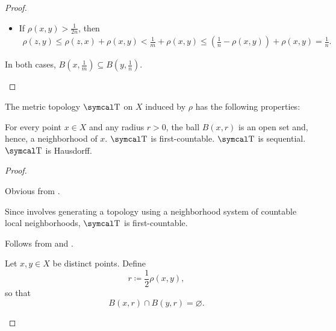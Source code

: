 \begin{proof}
\begin{description}
\begin{itemize}
      \item If \( \rho(x, y) > \tfrac 1 {2n} \), then
      \begin{align*}
        \rho(z, y)
        \leq
        \rho(z, x) + \rho(x, y)
        <
        \tfrac 1 m + \rho(x, y)
        \leq
        (\tfrac 1 n - \rho(x, y)) + \rho(x, y)
        =
        \tfrac 1 n.
      \end{align*}
    \end{itemize}

    In both cases, \( B(x, \tfrac 1 m) \subseteq B(y, \tfrac 1 n) \).
  \end{description}
\end{proof}

\begin{proposition}\label{thm:metric_topology_properties}
  The metric topology \( \CT \) on \( X \) induced by \( \rho \) has the following properties:
  \begin{defenum}
     For every point \( x \in X \) and any radius \( r > 0 \), the ball \( B(x, r) \) is an open set and, hence, a neighborhood of \( x \).
     \( \CT \) is first-countable.
     \( \CT \) is sequential.
     \( \CT \) is Hausdorff.
  \end{defenum}
\end{proposition}
\begin{proof}\mbox{}
  \begin{description}
     Obvious from .

     Since  involves generating a topology using a neighborhood system of countable local neighborhoods, \( \CT \) is first-countable.

     Follows from  and .

     Let \( x, y \in X \) be distinct points. Define
    \begin{equation*}
      r \coloneqq \dfrac 1 2 \rho(x, y),
    \end{equation*}
    so that
    \begin{equation*}
      B(x, r) \cap B(y, r) = \varnothing.
    \end{equation*}
  \end{description}
\end{proof}

